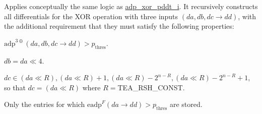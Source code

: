\-Applies conceptually the same logic as \hyperlink{adp-xor-pddt_8hh_a390612775ec87908fbb044d375ff9010}{adp\-\_\-xor\-\_\-pddt\-\_\-i}. \-It recursively constructs all differentials for the \-X\-O\-R operation with three inputs $(da, db, dc \rightarrow dd)$, with the additional requirement that they must satisfy the following properties\-:


\begin{DoxyEnumerate}
\item $\mathrm{adp}^{3\oplus}(da, db, dc \rightarrow dd) > p_\mathrm{thres}$.
\item $db = da \ll 4$.
\item $dc \in {(da \ll R), (da \ll R) + 1, (da \ll R) - 2^{n-R}, (da \ll R) - 2^{n-R} + 1}$, so that $dc = (da \ll R)$ where $R =$\-T\-E\-A\-\_\-\-R\-S\-H\-\_\-\-C\-O\-N\-S\-T.
\end{DoxyEnumerate}

\-Only the entries for which $\mathrm{eadp}^{F}(da \rightarrow dd) > p_\mathrm{thres}$ are stored.

